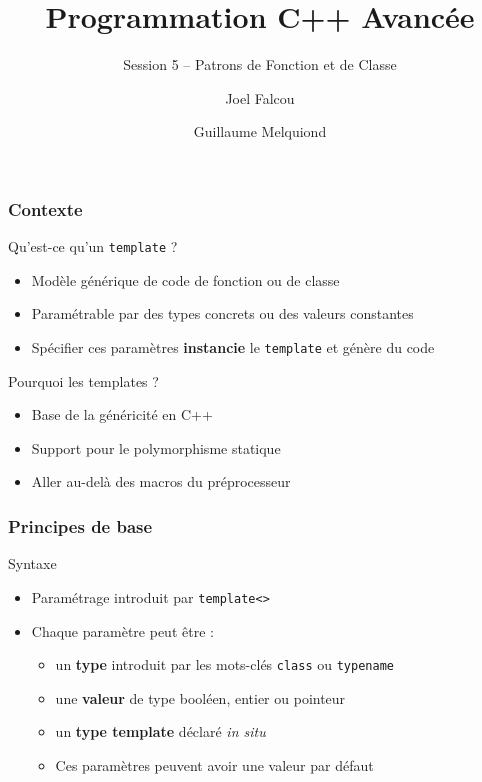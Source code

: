 \documentclass[svgnames]{beamer}
\title{Programmation C++ Avancée}
\subtitle{Session 5 -- Patrons de Fonction et de Classe}
\author{Joel Falcou \and Guillaume Melquiond}
\institute{Laboratoire de Recherche en Informatique}
\date{}
\begin{document}



\begin{frame}[plain]
\titlepage
\end{frame}
\setcounter{framenumber}{0}
\frame
{
  \frametitle{Contexte}
  \begin{block}{Qu'est-ce qu'un \texttt{template} ?}
  \begin{itemize}
  \item Modèle générique de code de fonction ou de classe
  \item Paramétrable par des types concrets ou des valeurs constantes
  \item Spécifier ces paramètres \textbf{instancie} le \texttt{template} et génère du code
  \end{itemize}
  \end{block}

  \begin{block}{Pourquoi les templates ?}
  \begin{itemize}
  \item Base de la généricité en C++
  \item Support pour le polymorphisme statique
  \item Aller au-delà des macros du préprocesseur
  \end{itemize}
  \end{block}
}

\frame
{
  \frametitle{Principes de base}
  \begin{block}{Syntaxe}
  \begin{itemize}
  \item Paramétrage introduit par \texttt{template<>}
  \item Chaque paramètre peut être :
  \begin{itemize}
  \item un \textbf{type} introduit par les mots-clés \texttt{class} ou \texttt{typename}
  \lstparamtype
  \item une \textbf{valeur} de type booléen, entier ou pointeur
  \lstparaminteger
  \item un \textbf{type template} déclaré \textit{in situ}
  \lstparamtmp
  \item Ces paramètres peuvent avoir une valeur par défaut
  \lstparamdefault
  \end{itemize}
  \end{itemize}
  \end{block}
}
\end{document}
